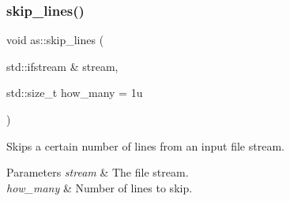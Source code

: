 \subsubsection{\texorpdfstring{skip\+\_\+lines()}{skip\_lines()}}
{\footnotesize\ttfamily void as\+::skip\+\_\+lines (\begin{DoxyParamCaption}\item[{std\+::ifstream \&}]{stream,  }\item[{std\+::size\+\_\+t}]{how\+\_\+many = {\ttfamily 1u} }\end{DoxyParamCaption})\hspace{0.3cm}{\ttfamily [inline]}}



Skips a certain number of lines from an input file stream. 


\begin{DoxyParams}{Parameters}
{\em stream} & The file stream. \\
\hline
{\em how\+\_\+many} & Number of lines to skip. \\
\hline
\end{DoxyParams}
